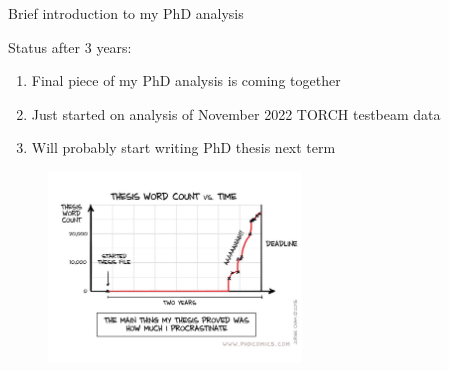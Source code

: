 \documentclass{beamer}
\begin{document}
\begin{frame}{Brief introduction to my PhD analysis}
  \begin{center}
    \Large{Status after 3 years:}
  \end{center}
  \vspace{0.1cm}
  \begin{enumerate}
    \setlength\itemsep{0.7em}
    \item{Final piece of my PhD analysis is coming together}
    \item{Just started on analysis of November 2022 TORCH testbeam data}
    \item{Will probably start writing PhD thesis next term}
  \end{enumerate}
  \vspace{-0.2cm}
  \begin{figure}
    \centering
    \includegraphics[width = 0.6\textwidth]{Plots/PhDThesisComic.jpg}
  \end{figure}
\end{frame}
\end{document}
